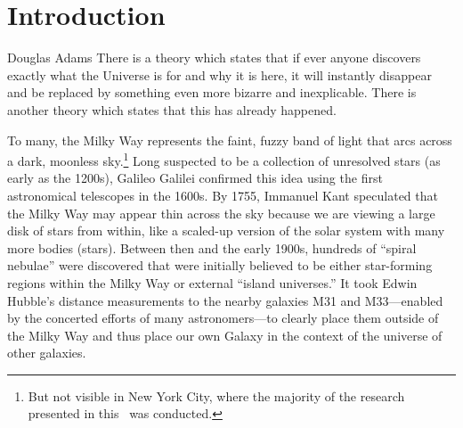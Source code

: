 \chapter[Introduction]{Introduction} \label{ch:intro}




\vspace{-16pt} \begin{chapquote}{Douglas Adams} \singlespacing There is a theory
which states that if ever anyone discovers exactly what the Universe is for and
why it is here, it will instantly disappear and be replaced by something even
more bizarre and inexplicable. There is another theory which states that this
has already happened. \end{chapquote} \vspace{-8pt}
\noindent\makebox[\linewidth]{\rule{0.5\textwidth}{0.5pt}} \vspace{1pt}

To many, the Milky Way represents the faint, fuzzy band of light that arcs
across a dark, moonless sky.\footnote{But not visible in New York City, where
the majority of the research presented in this \article\ was conducted.} Long
suspected to be a collection of unresolved stars (as early as the 1200s),
Galileo Galilei confirmed this idea using the first astronomical telescopes in
the 1600s. By 1755, Immanuel Kant speculated that the Milky Way may appear thin
across the sky because we are viewing a large disk of stars from within, like a
scaled-up version of the solar system with many more bodies (stars). Between
then and the early 1900s, hundreds of ``spiral nebulae'' were discovered that
were initially believed to be either star-forming regions within the Milky Way
or external ``island universes.'' It took Edwin Hubble's distance measurements
to the nearby galaxies M31 and M33---enabled by the concerted efforts of many
astronomers---to clearly place them outside of the Milky Way and thus place our
own Galaxy in the context of the universe of other galaxies.

